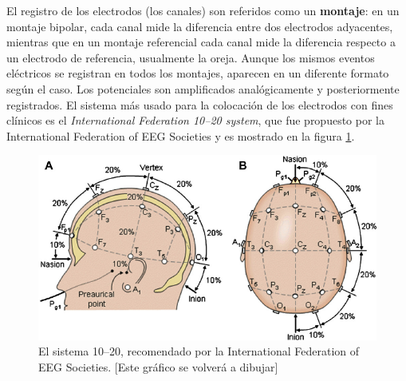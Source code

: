 \documentclass[12pt,a4paper]{mitthesis}
\begin{document}
El registro de los electrodos (los canales) son referidos como un \textbf{montaje}: en un montaje 
bipolar, cada canal mide la diferencia entre dos electrodos adyacentes, mientras que en un montaje 
referencial cada canal mide la diferencia respecto a un electrodo de referencia, usualmente la 
oreja.
Aunque los mismos eventos el\'ectricos se registran en todos los montajes, aparecen en un diferente 
formato seg\'un el caso. 
Los potenciales son amplificados anal\'ogicamente y posteriormente registrados.
El sistema m\'as usado para la colocaci\'on de los electrodos con fines cl\'inicos es el 
\textit{International Federation 10--20 system}, que fue propuesto por la International Federation 
of EEG Societies \cite{Jasper58,AASM07} y es mostrado en la figura \ref{img1020}. 

\begin{figure}
\centering
\includegraphics[width=0.9\linewidth]{Fig.png} 
\caption{El sistema 10--20, recomendado por la
International Federation of EEG Societies. [Este gr\'afico se volver\'a a dibujar]
}
\label{img1020}
\end{figure}
\end{document}
